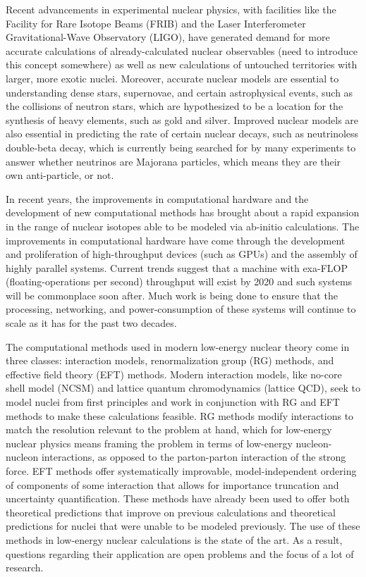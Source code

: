 Recent advancements in experimental nuclear physics, with facilities like the Facility for Rare Isotope Beams (FRIB) and the Laser Interferometer Gravitational-Wave Observatory (LIGO), have generated demand for more accurate calculations of already-calculated nuclear observables (need to introduce this concept somewhere) as well as new calculations of untouched territories with larger, more exotic nuclei. Moreover, accurate nuclear models are essential to understanding dense stars, supernovae, and certain astrophysical events, such as the collisions of neutron stars, which are hypothesized to be a location for the synthesis of heavy elements, such as gold and silver. Improved nuclear models are also essential in predicting the rate of certain nuclear decays, such as neutrinoless double-beta decay, which is currently being searched for by many experiments to answer whether neutrinos are Majorana particles, which means they are their own anti-particle, or not.

In recent years, the improvements in computational hardware and the development of new computational methods has brought about a rapid expansion in the range of nuclear isotopes able to be modeled via ab-initio calculations. The improvements in computational hardware have come through the development and proliferation of high-throughput devices (such as GPUs) and the assembly of highly parallel systems. Current trends suggest that a machine with exa-FLOP (floating-operations per second) throughput will exist by 2020 and such systems will be commonplace soon after. Much work is being done to ensure that the processing, networking, and power-consumption of these systems will continue to scale as it has for the past two decades. 

The computational methods used in modern low-energy nuclear theory come in three classes: interaction models, renormalization group (RG) methods, and effective field theory (EFT) methods. Modern interaction models, like no-core shell model (NCSM) and lattice quantum chromodynamics (lattice QCD), seek to model nuclei from first principles and work in conjunction with RG and EFT methods to make these calculations feasible. RG methods modify interactions to match the resolution relevant to the problem at hand, which for low-energy nuclear physics means framing the problem in terms of low-energy nucleon-nucleon interactions, as opposed to the parton-parton interaction of the strong force. EFT methods offer systematically improvable, model-independent ordering of components of some interaction that allows for importance truncation and uncertainty quantification. These methods have already been used to offer both theoretical predictions that improve on previous calculations and theoretical predictions for nuclei that were unable to be modeled previously. The use of these methods in low-energy nuclear calculations is the state of the art. As a result, questions regarding their application are open problems and the focus of a lot of research.


